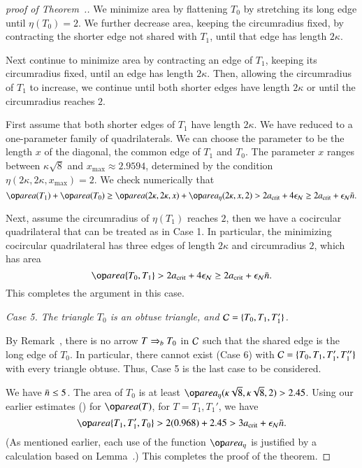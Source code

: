 \begin{proof}[proof of Theorem~.]
We minimize area by flattening $T_0$ by stretching its long edge until
$\eta(T_0)=2$.  We further decrease area, keeping the circumradius
fixed, by contracting the shorter edge not shared with $T_1$, until
that edge has length $2\kappa$.

Next continue to minimize area by contracting an edge of $T_1$,
keeping its circumradius fixed, until an edge has length $2\kappa$.
Then, allowing the circumradius of $T_1$ to increase, we continue until
both shorter edges have length $2\kappa$ or until the circumradius
reaches $2$.

First assume that both shorter edges of $T_1$ have length $2\kappa$.
We have reduced to a one-parameter family of quadrilaterals.  We can
choose the parameter to be the length $x$ of the diagonal, the common
edge of $T_1$ and $T_0$.  The parameter $x$ ranges between
$\kappa\sqrt{8}$ and $x_{\max}\approx 2.9594$, determined by the
condition $\eta(2\kappa,2\kappa,x_{\max}) = 2$.  We check numerically
that
\[
\area(T_1) + \area(T_0) \ge \area(2\kappa,2\kappa,x) +
\areta(2\kappa,x,2) > 2\acrit + 4 \epsN \ge 2\acrit + \epsN \tn.
\] 

Next, assume the circumradius of $\eta(T_1)$ reaches $2$, then we
have a cocircular quadrilateral that can be treated as in Case 1.  In
particular, the minimizing cocircular quadrilateral has three edges of
length $2\kappa$ and circumradius $2$, which has area
\[
\area\{T_0,T_1\}
>  2\acrit+4\epsN \ge 2\acrit+\epsN\tn.
\]
This completes the argument in this case.

{\it Case 5. The triangle $T_0$ is an obtuse triangle, and
  $\mathcal C=\{T_0,T_1,T_1'\}$.}

By Remark~, there is no arrow $T \Rightarrow_{b} T_0$ in $\mathcal C$
such that the shared edge is the long edge of $T_0$.  In particular,
there cannot exist (Case 6) with $\mathcal C=\{T_0,T_1,T_1',T_1''\}$ with
every triangle obtuse.  Thus, Case 5 is the last case to be
considered.

We have $\bar n\le 5$.
The area of $T_0$ is at least
$\areta(\kappa\sqrt{8},\kappa\sqrt{8},2) > 2.45$.  
Using our earlier estimates ()
for $\area(T)$, for $T=T_1,T_1'$, we
have
\[
\area\{T_1,T_1',T_0\} > 2 (0.968) + 2.45 > 3\acrit + \epsN\tn.
\] 
(As mentioned earlier, each use of the function $\areta$ is justified
by a calculation based on Lemma~.)
This completes the proof of the theorem.
\end{proof}


